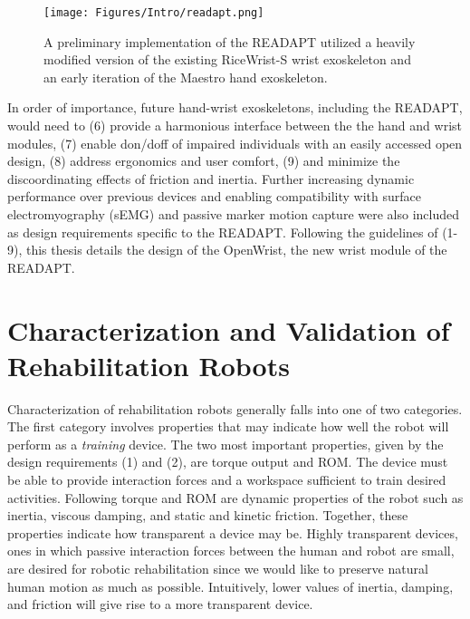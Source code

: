     \begin{figure}[!htb]
        \begin{center}
            \texttt{[image: Figures/Intro/readapt.png]}
            \caption{A preliminary implementation of the READAPT utilized a heavily modified version of the existing RiceWrist-S wrist exoskeleton and an early iteration of the Maestro hand exoskeleton. \cite{rose2015}}
            \label{fig:readapt_prelim}
        \end{center}
    \end{figure}

    In order of importance, future hand-wrist exoskeletons, including the READAPT, would need to (6) provide a harmonious interface between the the hand and wrist modules, (7) enable don/doff of impaired individuals with an easily accessed open design, (8) address ergonomics and user comfort, (9) and minimize the discoordinating effects of friction and inertia. Further increasing dynamic performance over previous devices and enabling compatibility with surface electromyography (sEMG) and passive marker motion capture were also included as design requirements specific to the READAPT. Following the guidelines of (1-9), this thesis details the design of the OpenWrist, the new wrist module of the READAPT.

    \section{Characterization and Validation of Rehabilitation Robots}

    Characterization of rehabilitation robots generally falls into one of two categories. The first category involves properties that may indicate how well the robot will perform as a \textit{training} device. The two most important properties, given by the design requirements (1) and (2), are torque output and ROM. The device must be able to provide interaction forces and a workspace sufficient to train desired activities. Following torque and ROM are dynamic properties of the robot such as inertia, viscous damping, and static and kinetic friction. Together, these properties indicate how transparent a device may be. Highly transparent devices, ones in which passive interaction forces between the human and robot are small, are desired for robotic rehabilitation since we would like to preserve natural human motion as much as possible. Intuitively, lower values of inertia, damping, and friction will give rise to a more transparent device.

